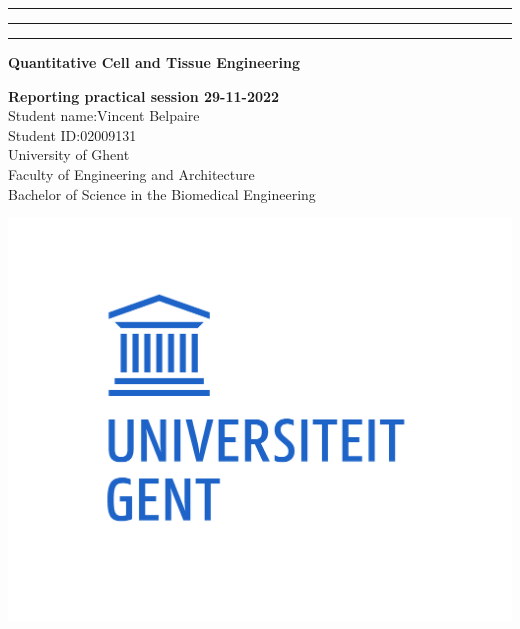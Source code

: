 {\color{ugent_blue} \hrule\hrule\hrule}

\vspace*{-0.43mm}
\colorbox{ugent_blue}{\color{white} \bf Quantitative Cell and Tissue Engineering}\\

\noindent\begin{minipage}{0.7\textwidth}%
{\LARGE \bf \color{ugent_blue} Reporting practical session 29-11-2022}\\[2mm]

%
{Student name:\large Vincent Belpaire}\\
{Student ID:\large 02009131}\\

{\small University of Ghent}\\
{\small Faculty of Engineering and Architecture}\\
{\small Bachelor of Science in the Biomedical Engineering}\\
\end{minipage}%
\hfill%
\begin{minipage}{0.3\textwidth}
\vspace{-2.2cm}
\begin{center}
\includegraphics[width=\linewidth]{ugent_logo}
\end{center}
\end{minipage}\\